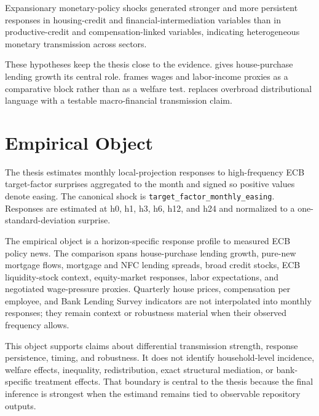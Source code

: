 \begin{hypothesis}
\label{hyp:differential-financial-intermediation}
Expansionary monetary-policy shocks generated stronger and more persistent responses in housing-credit and financial-intermediation variables than in productive-credit and compensation-linked variables, indicating heterogeneous monetary transmission across sectors.
\end{hypothesis}

These hypotheses keep the thesis close to the evidence.  gives house-purchase lending growth its central role.  frames wages and labor-income proxies as a comparative block rather than as a welfare test.  replaces overbroad distributional language with a testable macro-financial transmission claim.

\section{Empirical Object}

The thesis estimates monthly local-projection responses to high-frequency ECB target-factor surprises aggregated to the month and signed so positive values denote easing. The canonical shock is \nolinkurl{target_factor_monthly_easing}. Responses are estimated at h0, h1, h3, h6, h12, and h24 and normalized to a one-standard-deviation surprise.

The empirical object is a horizon-specific response profile to measured ECB policy news. The comparison spans house-purchase lending growth, pure-new mortgage flows, mortgage and NFC lending spreads, broad credit stocks, ECB liquidity-stock context, equity-market responses, labor expectations, and negotiated wage-pressure proxies. Quarterly house prices, compensation per employee, and Bank Lending Survey indicators are not interpolated into monthly responses; they remain context or robustness material when their observed frequency allows.

This object supports claims about differential transmission strength, response persistence, timing, and robustness. It does not identify household-level incidence, welfare effects, inequality, redistribution, exact structural mediation, or bank-specific treatment effects. That boundary is central to the thesis because the final inference is strongest when the estimand remains tied to observable repository outputs.

